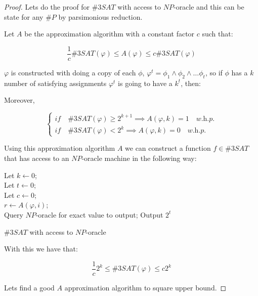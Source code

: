 \documentclass[12pt, a4paper]{article}
\begin{document}
\begin{proof}
  Lets do the proof for $\#3SAT$ with access to $NP$-oracle and this can be state for any $\#P$ by parsimonious reduction.

  Let $A$ be the approximation algorithm with a constant factor $c$ such that:

  \begin{equation}
    \frac{1}{c}\#3SAT(\varphi) \leq A(\varphi) \leq c\#3SAT(\varphi)
  \end{equation}

  $\varphi$ is constructed with doing a copy of each $\phi$, $\varphi^t = \phi_1 \land \phi_2 \land \dots \phi_t$, so if $\phi$ has a $k$ number of satisfying assignments $\varphi^t$ is going to have a $k^t$, then:

Moreover,

$$
\begin{cases}
  \textit{if} \quad \#3SAT(\varphi) \geq 2^{k+1} \implies A(\varphi,k) = 1 \quad \textit{w.h.p.}\\
  \textit{if} \quad \#3SAT(\varphi) < 2^k \implies A(\varphi,k) = 0 \quad \textit{w.h.p.}
\end{cases}
$$

Using this approximation algorithm $A$ we can construct a function $f \in \#3SAT$ that has access to an $NP$-oracle machine in the following way:

\begin{algorithm}[H]
  \Input{$\varphi$}
  Let $k \leftarrow 0$;\\
  Let $t \leftarrow 0$;\\
  Let $c \leftarrow 0$;\\
  {$r \leftarrow A(\varphi, i)$;\\
  }
  {Query $NP$-oracle for exact value to output;
  }{Output $2^t$}
 \caption{$\#3SAT$ with access to $NP$-oracle}
\end{algorithm}

With this we have that:

\begin{equation}
  \frac{1}{c}2^k \leq \#3SAT(\varphi) \leq c2^{k}
\end{equation}

Lets find a good $A$ approximation algorithm to square upper bound.


\end{proof}
\end{document}
